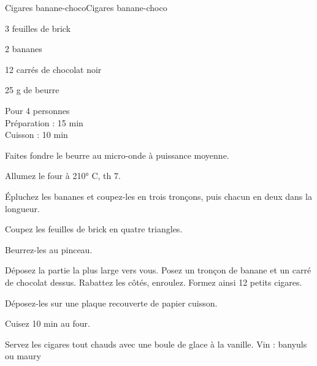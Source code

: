 \begin{recette}{Cigares banane-choco}{Cigares banane-choco}

\begin{ingredients}
3 feuilles de brick\par
2 bananes\par
12 carrés de chocolat noir\par
25 g de beurre\par
\end{ingredients}

\begin{infos}
Pour 4 personnes\\
Préparation : 15 min\\
Cuisson : 10 min\\
\end{infos}

\begin{etapes}
\item Faites fondre le beurre au micro-onde à puissance moyenne.
\item Allumez le four à 210° C, th 7.
\item Épluchez les bananes et coupez-les en trois tronçons, puis chacun en deux dans la longueur.
\item Coupez les feuilles de brick en quatre triangles.
\item Beurrez-les au pinceau.
\item Déposez la partie la plus large vers vous. Posez un tronçon de banane et un carré de chocolat dessus. Rabattez les côtés, enroulez. Formez ainsi 12 petits cigares.
\item Déposez-les sur une plaque recouverte de papier cuisson.
\item Cuisez 10 min au four.
\end{etapes}

\begin{conseils}
Servez les cigares tout chauds avec une boule de glace à la vanille.
Vin : banyuls ou maury
\end{conseils}

\end{recette}